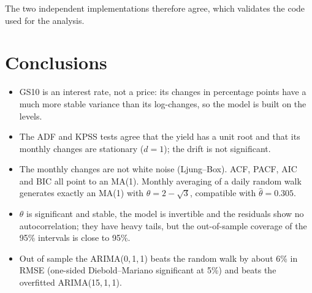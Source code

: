 \documentclass[11pt,a4paper]{article}
\begin{document}
The two independent implementations therefore agree, which validates the code used for the analysis.

\section{Conclusions}

\begin{itemize}
\item GS10 is an interest rate, not a price: its changes in percentage points have a much more stable variance than its log-changes, so the model is built on the levels.
\item The ADF and KPSS tests agree that the yield has a unit root and that its monthly changes are stationary ($d = 1$); the drift is not significant.
\item The monthly changes are not white noise (Ljung--Box). ACF, PACF, AIC and BIC all point to an MA(1). Monthly averaging of a daily random walk generates exactly an MA(1) with $\theta = 2 - \sqrt3$, compatible with $\hat\theta = 0.305$.
\item $\theta$ is significant and stable, the model is invertible and the residuals show no autocorrelation; they have heavy tails, but the out-of-sample coverage of the 95\% intervals is close to 95\%.
\item Out of sample the ARIMA(0,\,1,\,1) beats the random walk by about 6\% in RMSE (one-sided Diebold--Mariano significant at 5\%) and beats the overfitted ARIMA(15,\,1,\,1).
\end{itemize}
\end{document}
